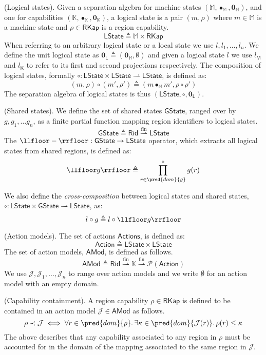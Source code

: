  (Logical states). Given a separation algebra for machine states $(\mathbb{M}, \bullet_\mathbb{M}, \mathbf{0}_\mathbb{M})$, and one for capabilities $(\mathbb{K}, \bullet_\mathbb{K}, \mathbf{0}_\mathbb{K})$, a logical state is a pair $(m, \rho)$ where $m \in \mathbb{M}$ is a machine state and $\rho \in \mathsf{RKap}$ is a region capability.
\[
	\mathsf{LState} \triangleq \mathbb{M} \times \mathsf{RKap}
\]
When referring to an arbitrary logical state or a local state we use $l, l_1, \ldots, l_n$. We define the unit logical state as $\mathbf{0}_\mathsf{L} \triangleq (\mathbf{0}_\mathbb{M}, \emptyset)$ and given a logical state $l$ we use $l_\mathsf{M}$ and $l_\mathsf{K}$ to refer to its first and second projections respectively. The composition of logical states, formally $\circ : \mathsf{LState} \times \mathsf{LState} \rightharpoonup \mathsf{LState}$, is defined as:
\[
	(m, \rho) \circ (m', \rho') \triangleq (m \bullet_\mathbb{M} m', \rho \circ \rho')
\]
The separation algebra of logical states is thus $(\mathsf{LState}, \circ, \mathbf{0}_\mathsf{L})$.

 (Shared states). We define the set of shared states $\mathsf{GState}$, ranged over by $g, g_1, \ldots g_n$, as a finite partial function mapping region identifiers to logical states.
\[
	\mathsf{GState} \triangleq \mathsf{Rid} \overset{\text{fin}}{\rightharpoonup} \mathsf{LState}
\]
The $\llfloor - \rrfloor : \mathsf{GState} \rightarrow \mathsf{LState}$ operator, which extracts all logical states from shared regions, is defined as:
\[
	\llfloor g \rrfloor \triangleq \prod^{\circ}_{r \in \pred{dom}{g}} g(r)
\]

We also define the \textit{cross-composition} between logical states and shared states, $\circ : \mathsf{LState} \times \mathsf{GState} \rightharpoonup \mathsf{LState}$, as:
\[
	l \circ g \triangleq l \circ \llfloor g \rrfloor
\]

 (Action models). The set of actions $\mathsf{Actions}$, is defined as:
\[
	\mathsf{Action} \triangleq \mathsf{LState} \times \mathsf{LState}
\]
The set of action models, $\mathsf{AMod}$, is defined as follows.
\[
	\mathsf{AMod} \triangleq \mathsf{Rid} \overset{\text{fin}}{\rightharpoonup} \mathbb{K} \overset{\text{fin}}{\rightharpoonup} \mathcal{P}(\mathsf{Action})
\]
We use $\mathcal{J}, \mathcal{J}_1, \ldots, \mathcal{J}_n$ to range over action models and we write $\emptyset$ for an action model with an empty domain.

 (Capability containment). A region capability $\rho \in \mathsf{RKap}$ is defined to be contained in an action model $\mathcal{J} \in \mathsf{AMod}$ as follows.
\[
	\rho \prec \mathcal{J} \iff \forall r \in \pred{dom}{\rho} \ldotp \exists \kappa \in \pred{dom}{\mathcal{J}(r)} \ldotp \rho(r) \leq \kappa
\]
The above describes that any capability associated to any region in $\rho$ must be accounted for in the domain of the mapping associated to the same region in $\mathcal{J}$.

